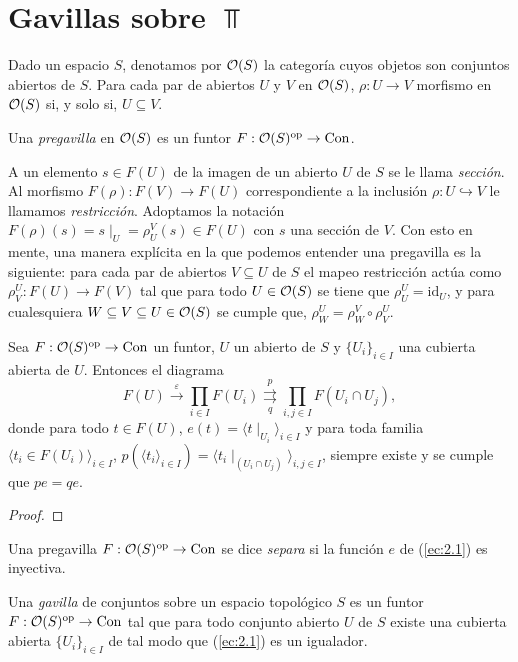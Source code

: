 \section{Gavillas sobre $\Top$}
Dado un espacio $S$, denotamos por ${\mathcal O}(S)$ la categoría cuyos objetos son conjuntos abiertos de $S$. Para cada par de abiertos $U$ y $V$ en ${\mathcal O}(S)$, $\rho:U\to V$ morfismo en ${\mathcal O}(S)$ si, y solo si, $U\subseteq V$.
\begin{definition}[Pregavilla]
    Una \emph{pregavilla} en ${\mathcal O}(S)$ es un funtor $F:{\mathcal O}(S)^{\mathrm{op}}\to{\mathrm{Con}}$.
\end{definition}
A un elemento $s\in F(U)$ de la imagen de un abierto $U$ de $S$ se le llama \emph{sección}. Al morfismo $F(\rho):F(V)\to F(U)$ correspondiente a la inclusión $\rho:U\hookrightarrow V$ le llamamos \emph{restricción}. Adoptamos la notación $F(\rho)(s)=s\mid_U=\rho^V_U(s)\in F(U)$ con $s$ una sección de $V$. Con esto en mente, una manera explícita en la que podemos entender una pregavilla es la siguiente: para cada par de abiertos $V\subseteq U$ de $S$ el mapeo restricción actúa como $\rho_V^U: F(U)\to F(V)$ tal que para todo $U\in{\mathcal O}(S)$ se  tiene que $\rho_U^U=\mathrm{id}_U$, y para cualesquiera $W\subseteq V\subseteq U\in{\mathcal O}(S)$ se cumple que, $\rho_W^U=\rho_W^V\circ\rho_V^U$.
\begin{lema}
    Sea $F:{\mathcal O}(S)^{\mathrm{op}}\to{\mathrm{Con}}$ un funtor, $U$ un abierto de $S$ y $\{U_i\}_{i\in I}$ una cubierta abierta de $U$. Entonces el diagrama 
    \begin{equation}\label{ec:2.1}
        F(U)\xrightarrow{\varepsilon}\prod_{i\in I} F(U_i)\overset{p}{\underset{q}{\rightrightarrows}}\prod_{i,j\in I}F(U_i\cap U_j),
    \end{equation}
    donde para todo $t\in F(U)$, $e(t)=\langle t\mid_{U_i}\rangle_{i\in I}$ y para toda familia $\langle t_i\in F(U_i)\rangle_{i\in I}$, $p(\langle t_i\rangle_{i\in I})=\langle t_i\mid_{(U_i\cap U_j)}\rangle_{i,j\in I}$, siempre existe y se cumple que $pe=qe$.
\end{lema}
\begin{proof}

\end{proof}
\begin{definition} Una pregavilla $F:{\mathcal O}(S)^{{\mathrm{op}}}\to{\mathrm{Con}}$ se dice \emph{separa} si la función $e$ de (\ref{ec:2.1}) es inyectiva. 
\end{definition}
\begin{definition}[Gavilla]
    Una \emph{gavilla} de conjuntos sobre un espacio topológico $S$ es un funtor $F:{\mathcal O}(S)^{\mathrm{op}}\to{\mathrm{Con}}$ tal que para todo conjunto abierto $U$ de $S$ existe una cubierta abierta $\{U_i\}_{i\in I}$ de tal modo que (\ref{ec:2.1}) es un igualador.  
\end{definition}

